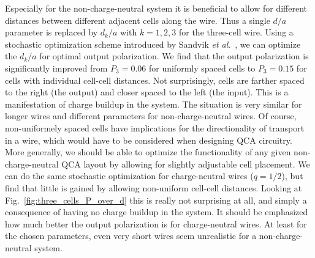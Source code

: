 Especially for the non-charge-neutral system it is beneficial to allow for
different distances between different adjacent cells along the wire. Thus a
single $d/a$ parameter is replaced by $d_k/a$ with $k = 1,2,3$ for the
three-cell wire. Using a stochastic optimization scheme introduced by Sandvik
\emph{et al}.\ \cite{Sandvik2007}, we can optimize the $d_k/a$ for optimal
output polarization. We find that the output polarization is significantly
improved from $P_3 = 0.06$ for uniformly spaced cells to $P_3 = 0.15$ for cells
with individual cell-cell distances. Not surprisingly, cells are farther spaced
to the right (the output) and closer spaced to the left (the input). This is a
manifestation of charge buildup in the system. The situation is very similar for
longer wires and different parameters for non-charge-neutral wires. Of course,
non-uniformely spaced cells have implications for the directionality of
transport in a wire, which would have to be considered when designing QCA
circuitry. More generally, we should be able to optimize the functionality of
any given non-charge-neutral QCA layout by allowing for slightly adjustable cell
placement. We can do the same stochastic optimization for charge-neutral wires
($q=1/2$), but find that little is gained by allowing non-uniform cell-cell
distances. Looking at Fig.~\ref{fig:three_cells_P_over_d} this is really not
surprising at all, and simply a consequence of having no charge buildup in the
system. It should be emphasized how much better the output polarization is for
charge-neutral wires. At least for the chosen parameters, even very short wires
seem unrealistic for a non-charge-neutral system.

